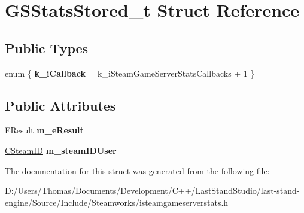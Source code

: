 \hypertarget{structGSStatsStored__t}{}\section{G\+S\+Stats\+Stored\+\_\+t Struct Reference}
\label{structGSStatsStored__t}
\subsection*{Public Types}
\begin{DoxyCompactItemize}
\item 
\hypertarget{structGSStatsStored__t_ae6a9d99fd0f7d586ffdfaa26a3886a25}{}enum \{ {\bfseries k\+\_\+i\+Callback} = k\+\_\+i\+Steam\+Game\+Server\+Stats\+Callbacks + 1
 \}\label{structGSStatsStored__t_ae6a9d99fd0f7d586ffdfaa26a3886a25}

\end{DoxyCompactItemize}
\subsection*{Public Attributes}
\begin{DoxyCompactItemize}
\item 
\hypertarget{structGSStatsStored__t_a11fe06b488dd6a220008e3a1461d4059}{}E\+Result {\bfseries m\+\_\+e\+Result}\label{structGSStatsStored__t_a11fe06b488dd6a220008e3a1461d4059}

\item 
\hypertarget{structGSStatsStored__t_a4db07b257b9a6ebb0695c12d42f307d5}{}\hyperlink{classCSteamID}{C\+Steam\+I\+D} {\bfseries m\+\_\+steam\+I\+D\+User}\label{structGSStatsStored__t_a4db07b257b9a6ebb0695c12d42f307d5}

\end{DoxyCompactItemize}


The documentation for this struct was generated from the following file\+:\begin{DoxyCompactItemize}
\item 
D\+:/\+Users/\+Thomas/\+Documents/\+Development/\+C++/\+Last\+Stand\+Studio/last-\/stand-\/engine/\+Source/\+Include/\+Steamworks/isteamgameserverstats.\+h\end{DoxyCompactItemize}
